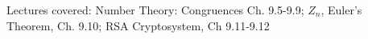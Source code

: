\documentclass[handout]{mcs}
\begin{document}
\renewcommand{\reading}{Chapter~\bref{number_theory_chap}.\ \emph{Number Theory} through~\bref{Euler_sec}.\ \emph{Euler's Theorem}.}


\begin{staffnotes}
Lectures covered: Number Theory: Congruences
Ch. 9.5-9.9; $Z_n$, Euler's Theorem, Ch. 9.10; RSA Cryptosystem, Ch 9.11-9.12
\end{staffnotes}






\end{document}
